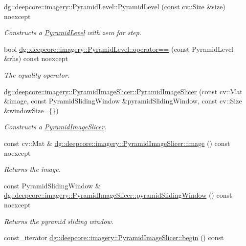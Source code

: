 \begin{DoxyCompactItemize}
\hyperlink{group___imagery_module_ga64dc65f27bed7bb4888bc0375eb9d99a}{dg\+::deepcore\+::imagery\+::\+Pyramid\+Level\+::\+Pyramid\+Level} (const cv\+::\+Size \&size) noexcept
\begin{DoxyCompactList}\small\item\em Constructs a \hyperlink{structdg_1_1deepcore_1_1imagery_1_1_pyramid_level}{Pyramid\+Level} with zero for step. \end{DoxyCompactList}\item 
bool \hyperlink{group___imagery_module_ga4195fc5c6eb71435e4aa06165bbb6f36}{dg\+::deepcore\+::imagery\+::\+Pyramid\+Level\+::operator==} (const Pyramid\+Level \&rhs) const noexcept
\begin{DoxyCompactList}\small\item\em The equality operator. \end{DoxyCompactList}\item 
\hyperlink{group___imagery_module_gaaebf1aa82f6ff98fd3eb8c65544c7ce1}{dg\+::deepcore\+::imagery\+::\+Pyramid\+Image\+Slicer\+::\+Pyramid\+Image\+Slicer} (const cv\+::\+Mat \&image, const Pyramid\+Sliding\+Window \&pyramid\+Sliding\+Window, const cv\+::\+Size \&window\+Size=\{\})
\begin{DoxyCompactList}\small\item\em Constructs a \hyperlink{classdg_1_1deepcore_1_1imagery_1_1_pyramid_image_slicer}{Pyramid\+Image\+Slicer}. \end{DoxyCompactList}\item 
const cv\+::\+Mat \& \hyperlink{group___imagery_module_ga90b67bc2fa06b73b89d73c8216931bc9}{dg\+::deepcore\+::imagery\+::\+Pyramid\+Image\+Slicer\+::image} () const noexcept
\begin{DoxyCompactList}\small\item\em Returns the image. \end{DoxyCompactList}\item 
const Pyramid\+Sliding\+Window \& \hyperlink{group___imagery_module_ga7558b54bb237cddcf03b4442471c06ef}{dg\+::deepcore\+::imagery\+::\+Pyramid\+Image\+Slicer\+::pyramid\+Sliding\+Window} () const noexcept
\begin{DoxyCompactList}\small\item\em Returns the pyramid sliding window. \end{DoxyCompactList}\item 
const\+\_\+iterator \hyperlink{group___imagery_module_gac100b1de973af8ac0c9a5e1c3dc8d755}{dg\+::deepcore\+::imagery\+::\+Pyramid\+Image\+Slicer\+::begin} () const 

\end{DoxyCompactItemize}

